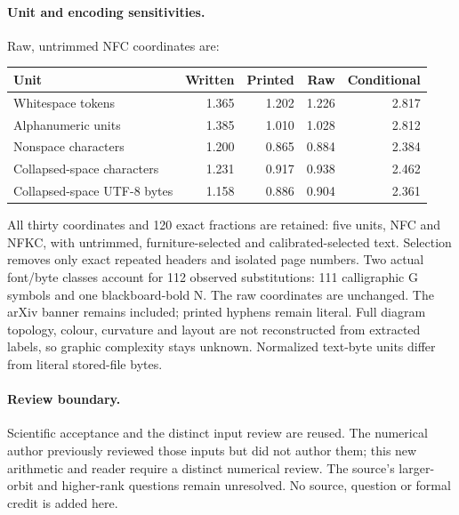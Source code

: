 \documentclass[11pt,a4paper]{article}
\begin{document}
\paragraph{Unit and encoding sensitivities.}
Raw, untrimmed NFC coordinates are:
\begin{center}\small\begin{tabular}{lrrrr}\toprule
Unit&Written&Printed&Raw&Conditional\\\midrule
Whitespace tokens & 1.365 & 1.202 & 1.226 & 2.817 \\
Alphanumeric units & 1.385 & 1.010 & 1.028 & 2.812 \\
Nonspace characters & 1.200 & 0.865 & 0.884 & 2.384 \\
Collapsed-space characters & 1.231 & 0.917 & 0.938 & 2.462 \\
Collapsed-space UTF-8 bytes & 1.158 & 0.886 & 0.904 & 2.361 \\
\bottomrule\end{tabular}\end{center}
All thirty coordinates and 120 exact fractions are retained: five units,
NFC and NFKC, with untrimmed, furniture-selected and calibrated-selected
text. Selection removes only exact repeated headers and isolated page
numbers. Two actual font/byte classes account for 112 observed substitutions:
111 calligraphic G symbols and one blackboard-bold N. The raw coordinates
are unchanged. The arXiv banner remains included; printed hyphens remain
literal. Full diagram topology, colour, curvature and layout are not
reconstructed from extracted labels, so graphic complexity stays unknown.
Normalized text-byte units differ from literal stored-file bytes.

\paragraph{Review boundary.}
Scientific acceptance and the distinct input review are reused. The numerical
author previously reviewed those inputs but did not author them; this new
arithmetic and reader require a distinct numerical review. The source's
larger-orbit and higher-rank questions remain unresolved. No source, question
or formal credit is added here.
\end{document}
